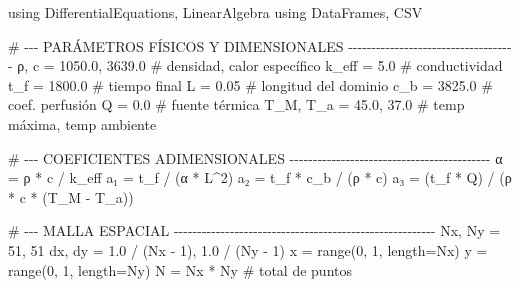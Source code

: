 \documentclass[
  spanish,
  us-letterpaper,
  DIV=11,
  numbers=noendperiod]{scrreprt}
\newenvironment{Shaded}{\begin{snugshade}}{\end{snugshade}}
\newcommand{\BuiltInTok}[1]{\textcolor[rgb]{0.00,0.23,0.31}{#1}}
\newcommand{\CommentTok}[1]{\textcolor[rgb]{0.37,0.37,0.37}{#1}}
\newcommand{\FloatTok}[1]{\textcolor[rgb]{0.68,0.00,0.00}{#1}}
\newcommand{\FunctionTok}[1]{\textcolor[rgb]{0.28,0.35,0.67}{#1}}
\newcommand{\ImportTok}[1]{\textcolor[rgb]{0.00,0.46,0.62}{#1}}
\newcommand{\NormalTok}[1]{\textcolor[rgb]{0.00,0.23,0.31}{#1}}
\newcommand{\OperatorTok}[1]{\textcolor[rgb]{0.37,0.37,0.37}{#1}}
\theoremstyle{plain}
\theoremstyle{definition}
\theoremstyle{remark}
\begin{document}
\begin{Shaded}
\begin{Highlighting}[]
\ImportTok{using} \BuiltInTok{DifferentialEquations}\NormalTok{, }\BuiltInTok{LinearAlgebra}
\ImportTok{using} \BuiltInTok{DataFrames}\NormalTok{, }\BuiltInTok{CSV}

\CommentTok{\# {-}{-}{-} PARÁMETROS FÍSICOS Y DIMENSIONALES {-}{-}{-}{-}{-}{-}{-}{-}{-}{-}{-}{-}{-}{-}{-}{-}{-}{-}{-}{-}{-}{-}{-}{-}{-}{-}{-}{-}{-}{-}{-}{-}{-}{-}{-}{-}}
\NormalTok{ρ, c  }\OperatorTok{=} \FloatTok{1050.0}\NormalTok{, }\FloatTok{3639.0}                        \CommentTok{\# densidad, calor específico }
\NormalTok{k\_eff }\OperatorTok{=} \FloatTok{5.0}                                   \CommentTok{\# conductividad}
\NormalTok{t\_f   }\OperatorTok{=} \FloatTok{1800.0}                                \CommentTok{\# tiempo final }
\NormalTok{L     }\OperatorTok{=} \FloatTok{0.05}                                  \CommentTok{\# longitud del dominio}
\NormalTok{c\_b   }\OperatorTok{=} \FloatTok{3825.0}                                \CommentTok{\# coef. perfusión}
\NormalTok{Q     }\OperatorTok{=} \FloatTok{0.0}                                   \CommentTok{\# fuente térmica}
\NormalTok{T\_M, T\_a }\OperatorTok{=} \FloatTok{45.0}\NormalTok{, }\FloatTok{37.0}                         \CommentTok{\# temp máxima, temp ambiente}

\CommentTok{\# {-}{-}{-} COEFICIENTES ADIMENSIONALES {-}{-}{-}{-}{-}{-}{-}{-}{-}{-}{-}{-}{-}{-}{-}{-}{-}{-}{-}{-}{-}{-}{-}{-}{-}{-}{-}{-}{-}{-}{-}{-}{-}{-}{-}{-}{-}{-}{-}{-}{-}{-}{-}}
\NormalTok{α }\OperatorTok{=}\NormalTok{ ρ }\OperatorTok{*}\NormalTok{ c }\OperatorTok{/}\NormalTok{ k\_eff}
\NormalTok{a₁ }\OperatorTok{=}\NormalTok{ t\_f }\OperatorTok{/}\NormalTok{ (α }\OperatorTok{*}\NormalTok{ L}\OperatorTok{\^{}}\FloatTok{2}\NormalTok{)}
\NormalTok{a₂ }\OperatorTok{=}\NormalTok{ t\_f }\OperatorTok{*}\NormalTok{ c\_b }\OperatorTok{/}\NormalTok{ (ρ }\OperatorTok{*}\NormalTok{ c)}
\NormalTok{a₃ }\OperatorTok{=}\NormalTok{ (t\_f }\OperatorTok{*}\NormalTok{ Q) }\OperatorTok{/}\NormalTok{ (ρ }\OperatorTok{*}\NormalTok{ c }\OperatorTok{*}\NormalTok{ (T\_M }\OperatorTok{{-}}\NormalTok{ T\_a))}

\CommentTok{\# {-}{-}{-} MALLA ESPACIAL {-}{-}{-}{-}{-}{-}{-}{-}{-}{-}{-}{-}{-}{-}{-}{-}{-}{-}{-}{-}{-}{-}{-}{-}{-}{-}{-}{-}{-}{-}{-}{-}{-}{-}{-}{-}{-}{-}{-}{-}{-}{-}{-}{-}{-}{-}{-}{-}{-}{-}{-}{-}{-}{-}{-}{-}}
\NormalTok{Nx, Ny }\OperatorTok{=} \FloatTok{51}\NormalTok{, }\FloatTok{51}
\NormalTok{dx, dy }\OperatorTok{=} \FloatTok{1.0} \OperatorTok{/}\NormalTok{ (Nx }\OperatorTok{{-}} \FloatTok{1}\NormalTok{), }\FloatTok{1.0} \OperatorTok{/}\NormalTok{ (Ny }\OperatorTok{{-}} \FloatTok{1}\NormalTok{)}
\NormalTok{x }\OperatorTok{=} \FunctionTok{range}\NormalTok{(}\FloatTok{0}\NormalTok{, }\FloatTok{1}\NormalTok{, length}\OperatorTok{=}\NormalTok{Nx)}
\NormalTok{y }\OperatorTok{=} \FunctionTok{range}\NormalTok{(}\FloatTok{0}\NormalTok{, }\FloatTok{1}\NormalTok{, length}\OperatorTok{=}\NormalTok{Ny)}
\NormalTok{N }\OperatorTok{=}\NormalTok{ Nx }\OperatorTok{*}\NormalTok{ Ny  }\CommentTok{\# total de puntos}


\end{Highlighting}
\end{Shaded}
\end{document}
